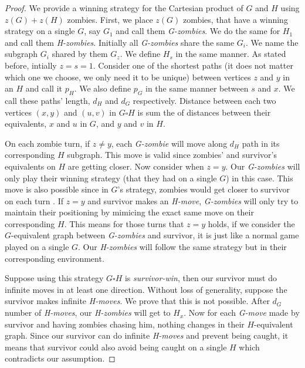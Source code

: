 \documentclass[1p]{elsarticle}
\begin{document}
\begin{proof}
	We provide a winning strategy for the Cartesian product of $G$ and $H$ using $z(G)+z(H)$ zombies. First, we place
	$z(G)$ zombies, that have a winning strategy on a single $G$, say $G_{1}$ and call them {\it G-zombies}. We do the
	same for $H_{1}$ and call them {\it H-zombies}. Initially all {\it G-zombies} share the same $G_{i}$. We name the
	subgraph $G_{i}$ shared by them $G_{z}$. We define $H_{s}$ in the same manner. As stated before, intially $z=s=1$.
	Consider one of the shortest paths (it does not matter which one we choose, we only need it to be unique) between
	vertices $z$ and $y$ in an $H$ and call it $p_H$. We also define $p_G$  in the same manner between $s$ and $x$. We
	call these paths' length, $d_H$ and $d_G$ respectively. Distance between each two vertices $(x,y)$ and $(u,v)$ in $G
	\square H$ is sum the of distances between their equivalents, $x$ and $u$ in $G$, and $y$ and $v$ in $H$.


	On each zombie turn, if $z \neq y$, each {\it G-zombie} will move along $d_H$ path in its corresponding $H$
	subgraph.  This move is valid since zombies' and survivor's equivalents on $H$ are getting closer. Now consider when $z =
	y$. Our {\it G-zombies} will only play their winning strategy (that they had on a single $G$) in this case. This
	move is also possible since in $G$'s strategy, zombies would get closer to survivor on each turn . If $z = y$ and
	survivor makes an {\it H-move}, {\it G-zombies} will only try to maintain their positioning by mimicing the exact
	same move on their corresponding $H$. This means for those turns that $z=y$ holds, if we consider the $G$-equivalent
	graph between {\it G-zombies} and survivor, it is just like a normal game played on a single $G$. Our {\it
	H-zombies} will follow the same strategy but in their corresponding environment.
	
	
	Suppose using this strategy $G \square H$ is {\it survivor-win}, then our survivor must do infinite moves in at
	least one direction. Without loss of generality, suppose the survivor makes infinite {\it H-moves}. We prove that
	this is not possible. After $d_G$ number of {\it H-moves}, our {\it H-zombies} will get to $H_x$. Now for each {\it
	G-move} made by survivor and having zombies chasing him, nothing changes in their $H$-equivalent graph. Since our
	survivor can do infinite {\it H-moves} and prevent being caught, it means that survivor could also avoid being
	caught on a single $H$ which contradicts our assumption.
	
\end{proof}
\end{document}
